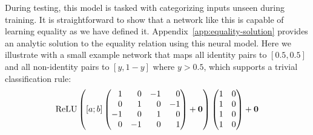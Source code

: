 \documentclass[9pt,twocolumn,twoside,lineno]{pnas-new}
\newcommand{\Appref}[1]{Appendix~\ref{#1}}
\newcommand{\update}[1]{{\color{darkblue}#1}}
\DeclareMathOperator{\ReLU}{ReLU}
\begin{document}
During testing, this model is tasked with categorizing inputs unseen during training.  It is straightforward to show that a network like this is capable of learning equality as we have defined it. \Appref{app:equality-solution} provides an analytic solution to the equality relation using this neural model.  \update{Here we illustrate with a small example network that maps all identity pairs to $[0.5, 0.5]$ and all non-identity pairs to $[y, 1-y]$ where $y > 0.5$, which supports a trivial classification rule:
%
\setlength{\arraycolsep}{4pt}
\begin{equation}
\ReLU\left(
  [a;b]
  \left(
    \begin{array}[c]{@{} *{4}{r} @{}}
      1 &  0 &  -1 & 0  \\
      0 &  1 &  0 & -1 \\
      -1 &  0 &  1 & 0  \\
      0 &  -1 &  0 & 1
    \end{array}
  \right)
  +
  \mathbf{0}
\right)
\left(
  \begin{array}[c]{@{} r r @{}}
    1 & 0 \\
    1 & 0\\
    1 & 0\\
    1 & 0\\
  \end{array}
\right)
+
\mathbf{0}
\end{equation}}
\end{document}
